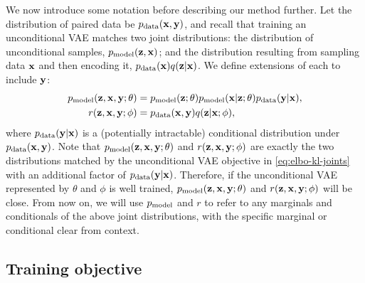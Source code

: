 We now introduce some notation before describing our method further. Let the
distribution of paired data be $p_{\rm{data}}{}(\mathbf{x}{}, \mathbf{y}{})$, and recall that
training an unconditional VAE matches two joint distributions: the distribution
of unconditional samples, $p_{\rm{model}}{}(\mathbf{z}{}, \mathbf{x}{})$; and the distribution
resulting from sampling data $\mathbf{x}{}$ and then encoding it, $p_{\rm{data}}{}(\mathbf{x}{})q(\mathbf{z}{}|\mathbf{x}{})$.
We define
extensions of each to include $\mathbf{y}{}$:
\begin{align}
  p_{\rm{model}}{}(\mathbf{z}{}, \mathbf{x}{}, \mathbf{y}{}; \theta) &= p_{\rm{model}}{}(\mathbf{z}{}; \theta)p_{\rm{model}}{}(\mathbf{x}{}|\mathbf{z}{}; \theta)p_{\rm{data}}{}(\mathbf{y}{}|\mathbf{x}{}), \label{eq:pmodel} \\
  r(\mathbf{z}{}, \mathbf{x}{}, \mathbf{y}{}; \phi) &= p_{\rm{data}}{}(\mathbf{x}{}, \mathbf{y}{})q(\mathbf{z}{}|\mathbf{x}{}; \phi), \label{eq:r}
\end{align}
where $p_{\rm{data}}{}(\mathbf{y}{}|\mathbf{x}{})$ is a (potentially intractable) conditional
distribution under $p_{\rm{data}}{}(\mathbf{x}{}, \mathbf{y}{})$.
%
Note that $p_{\rm{model}}{}(\mathbf{z}{}, \mathbf{x}{}, \mathbf{y}{}; \theta)$ and $r(\mathbf{z}{}, \mathbf{x}{}, \mathbf{y}{};
\phi)$ are exactly the two distributions matched by the unconditional VAE
objective in \cref{eq:elbo-kl-joints} with an additional factor of
$p_{\rm{data}}{}(\mathbf{y}{}|\mathbf{x}{})$.
%
Therefore, if the unconditional VAE represented by $\theta$ and $\phi$ is well
trained, $p_{\rm{model}}{}(\mathbf{z}{}, \mathbf{x}{}, \mathbf{y}{}; \theta)$ and
$r(\mathbf{z}{}, \mathbf{x}{}, \mathbf{y}{}; \phi)$ will be close. From now on, we will use
$p_{\rm{model}}{}$ and $r$ to refer to any marginals and conditionals of the above
joint distributions, with the specific marginal or conditional clear from
context.

\subsection{Training objective}

